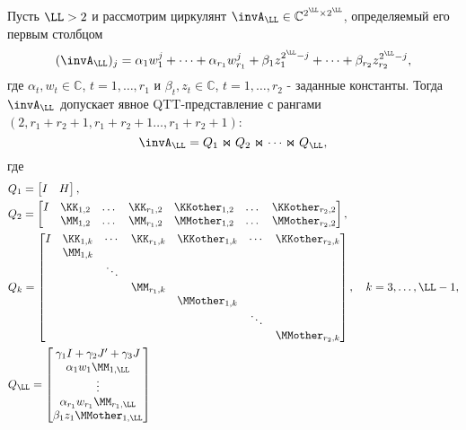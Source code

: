 \begin{corollary} \label{prop:sum_z_stable}
	Пусть $\LL >2$ и рассмотрим циркулянт $\invA_\LL \in \mathbb{C}^{2^\LL \times 2^\LL}$, определяемый его первым столбцом
	\[
	(\invA_\LL)_j = \alpha_1 w_1^j + \dots + \alpha_{r_1} w_{r_1}^j + \beta_1 z_1^{2^{\LL}-j} + \dots + \beta_{r_2} z_{r_2}^{2^{\LL}-j},
	\]
	где $\alpha_t,w_t\in\mathbb{C}$, $t=1,\dots,r_1$ и $\beta_t,z_t\in\mathbb{C}$, $t=1,\dots,r_2$ - заданные константы.
	Тогда $\invA_\LL$ допускает явное QTT-представление с рангами $(2,r_1+r_2+1,r_1 + r_2 +1\dots, r_1 + r_2 +1)$:
	\[
	\invA_\LL = Q_1 \Join Q_2\Join \dots \Join Q_\LL,
	\]
	где
	\[
	\begin{split}
	&Q_1 = 
	\begin{bmatrix}
	I & H
	\end{bmatrix},
	\\
	&Q_2 = 
	\begin{bmatrix}
	I
	&
	\KK_{1,2} & \dots & \KK_{r_1,2} 
	&
	\KKother_{1,2} & \dots & \KKother_{r_2,2}
	\\
	&
	\MM_{1,2} & \dots & \MM_{r_1,2}
	&
	\MMother_{1,2} & \dots & \MMother_{r_2,2}
	\end{bmatrix},
	\\
	&Q_k = 
	\begin{bmatrix}
	I
	&
	\KK_{1,k} & \cdots & \KK_{r_1,k}
	&
	\KKother_{1,k} & \cdots & \KKother_{r_2,k}
	\\
	&
	\MM_{1,k} & & & & & \\
	& & \ddots  & & & \\
	& & & \MM_{r_1,k} & & & \\
	& & & & \MMother_{1,k} & & \\
	& & & & & \ddots & \\ 
	& & & & &        & \MMother_{r_2,k}
	\end{bmatrix}, 
	\quad k =3,\dots,\LL-1, \\
	&Q_\LL = 
	\begin{bmatrix}
	\gamma_1 I + \gamma_2 J' + \gamma_3 J \\
	\alpha_1 w_1 \MM_{1,\LL}\\
	\vdots \\
	\alpha_{r_1} w_{r_1} \MM_{r_1,\LL} \\
	\beta_{1} z_{1} \MMother_{1,\LL}\\

\end{bmatrix}
\end{split}\]
\end{corollary}
